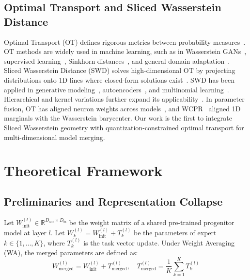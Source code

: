 \documentclass{article}
\theoremstyle{plain}
\theoremstyle{definition}
\theoremstyle{remark}
\begin{document}
\subsection{Optimal Transport and Sliced Wasserstein Distance}
Optimal Transport (OT) defines rigorous metrics between probability measures~\cite{kantorovich1942translocation, monge1781memoire, wasserstein1969markov, brenier1991polar, peyre2019computational, villani2009optimal}. OT methods are widely used in machine learning, such as in Wasserstein GANs~\cite{arjovsky2017wasserstein}, supervised learning~\cite{frogner2015learning}, Sinkhorn distances~\cite{cuturi2013sinkhorn}, and general domain adaptation~\cite{kolouri2017optimal, genevay2018learning}. Sliced Wasserstein Distance (SWD) solves high-dimensional OT by projecting distributions onto 1D lines where closed-form solutions exist~\cite{rabin2011wasserstein, bonneel2015sliced}. SWD has been applied in generative modeling~\cite{deshpande2018generative}, autoencoders~\cite{meng2019sliced}, and multinomial learning~\cite{kolouri2019sliced, nadjahi2019asymptotic, nadjahi2020approximate}. Hierarchical and kernel variations further expand its applicability~\cite{nguyen2021hierarchical, carriere2020sliced, bonet2021sliced}. In parameter fusion, OT has aligned neuron weights across models~\cite{singh2020model}, and WCPR~\cite{leclaire2024wcpr} aligned 1D marginals with the Wasserstein barycenter. Our work is the first to integrate Sliced Wasserstein geometry with quantization-constrained optimal transport for multi-dimensional model merging.

\section{Theoretical Framework}
\label{sec:theory}

\subsection{Preliminaries and Representation Collapse}

Let $W^{(l)}_{\text{init}} \in \mathbb{R}^{D_{\text{out}} \times D_{\text{in}}}$ be the weight matrix of a shared pre-trained progenitor model at layer $l$. Let $W^{(l)}_k = W^{(l)}_{\text{init}} + T^{(l)}_k$ be the parameters of expert $k \in \{1, \dots, K\}$, where $T^{(l)}_k$ is the task vector update. Under Weight Averaging (WA), the merged parameters are defined as:
\begin{equation}
W^{(l)}_{\text{merged}} = W^{(l)}_{\text{init}} + T^{(l)}_{\text{merged}}, \quad T^{(l)}_{\text{merged}} = \frac{1}{K} \sum_{k=1}^K T^{(l)}_k
\end{equation}
\end{document}
